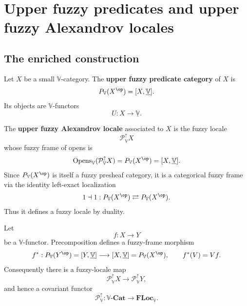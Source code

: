 \section{Upper fuzzy predicates and upper fuzzy Alexandrov locales}
\label{sec:upper-fuzzy-predicates}

\subsection{The enriched construction}
\label{subsec:upper-predicates-enriched}

\begin{definition}
\label{def:upper-fuzzy-predicates-enriched}
Let \(X\) be a small \(\mathbb V\)-category.  The \textbf{upper fuzzy predicate
category} of \(X\) is
\[
    P_{\mathbb V}(X^{\op})
    =
    [X,\underline{\mathbb V}].
\]
Its objects are \(\mathbb V\)-functors
\[
    U:X\to\underline{\mathbb V}.
\]
\end{definition}

\begin{definition}
\label{def:upper-fuzzy-alexandrov-locale}
The \textbf{upper fuzzy Alexandrov locale} associated to \(X\) is the fuzzy locale
\[
    \mathcal P_{\mathbb V}^{\uparrow}X
\]
whose fuzzy frame of opens is
\[
    \operatorname{Opens}_{\mathbb V}(\mathcal P_{\mathbb V}^{\uparrow}X)
    =
    P_{\mathbb V}(X^{\op})
    =
    [X,\underline{\mathbb V}].
\]
Since \(P_{\mathbb V}(X^{\op})\) is itself a fuzzy presheaf category, it is a
categorical fuzzy frame via the identity left-exact localization
\[
    1\dashv 1:
    P_{\mathbb V}(X^{\op})
    \rightleftarrows
    P_{\mathbb V}(X^{\op}).
\]
Thus it defines a fuzzy locale by duality.
\end{definition}

\begin{proposition}
\label{prop:upper-fuzzy-predicates-functorial}
Let
\[
    f:X\to Y
\]
be a \(\mathbb V\)-functor.  Precomposition defines a fuzzy-frame morphism
\[
    f^\ast:
    P_{\mathbb V}(Y^{\op})
    =
    [Y,\underline{\mathbb V}]
    \longrightarrow
    [X,\underline{\mathbb V}]
    =
    P_{\mathbb V}(X^{\op}),
    \qquad
    f^\ast(V)=Vf.
\]
Consequently there is a fuzzy-locale map
\[
    \mathcal P_{\mathbb V}^{\uparrow}X
    \longrightarrow
    \mathcal P_{\mathbb V}^{\uparrow}Y,
\]
and hence a covariant functor
\[
    \mathcal P_{\mathbb V}^{\uparrow}:
    \mathbb V\text{-}\mathbf{Cat}
    \longrightarrow
    \mathbf{FLoc}_{\mathbb V}.
\]
\end{proposition}

